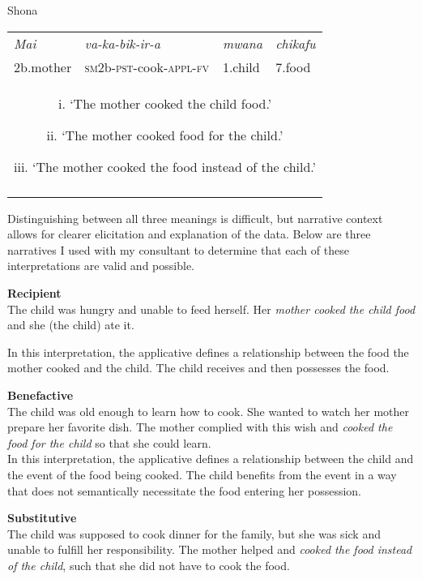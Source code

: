 \documentclass[output=paper]{langscibook}
\begin{document}
\ea\label{ex:wechsler:14}
Shona\\

\tablefirsthead{}

\tabletail{}
\tablelasttail{}
\begin{tabularx}{\textwidth}{XXXX}
\lsptoprule
\textit{Mai} & \textit{va-ka-bik-ir-a}                 & \textit{mwana} & \textit{chikafu}\\
2b.mother & \textsc{sm2}b-\textsc{pst-}cook\textsc{{}-appl}{}-\textsc{fv} & 1.child & 7.food\\
\multicolumn{4}{c}{i. ‘The mother cooked the child food.’

ii. ‘The mother cooked food for the child.’

iii. ‘The mother cooked the food instead of the child.’}\\
\lspbottomrule
\end{tabularx}
\z

Distinguishing between all three meanings is difficult, but narrative context allows for clearer elicitation and explanation of the data. Below are three narratives I used with my consultant to determine that each of these interpretations are valid and possible. 


\ea\label{ex:wechsler:15}
\textbf{Recipient}\\
The child was hungry and unable to feed herself. Her \textit{mother cooked the child food} and she (the child) ate it.\\
\z

In this interpretation, the applicative defines a relationship between the food the mother cooked and the child. The child receives and then possesses the food. 


\ea\label{ex:wechsler:16}
\textbf{Benefactive}\\
The child was old enough to learn how to cook. She wanted to watch her mother prepare her favorite dish. The mother complied with this wish and \textit{cooked the food for the child} so that she could learn.\\

In this interpretation, the applicative defines a relationship between the child and the event of the food being cooked. The child benefits from the event in a way that does not semantically necessitate the food entering her possession. 


\ea\label{ex:wechsler:17}
\textbf{Substitutive}\\
The child was supposed to cook dinner for the family, but she was sick and unable to fulfill her responsibility. The mother helped and \textit{cooked the food instead of the child}, such that she did not have to cook the food.\\
\z
\end{document}
